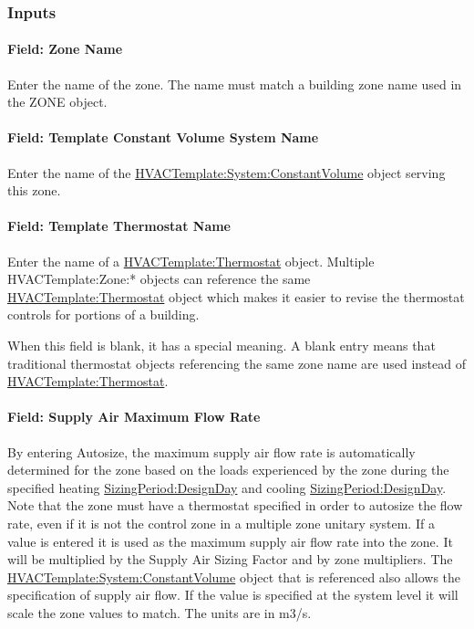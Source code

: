 \subsubsection{Inputs}\label{inputs-12-006}

\paragraph{Field: Zone Name}\label{field-zone-name-11}

Enter the name of the zone. The name must match a building zone name used in the ZONE object.

\paragraph{Field: Template Constant Volume System Name}\label{field-template-constant-volume-system-name}

Enter the name of the \hyperref[hvactemplatesystemconstantvolume]{HVACTemplate:System:ConstantVolume} object serving this zone.

\paragraph{Field: Template Thermostat Name}\label{field-template-thermostat-name-11}

Enter the name of a \hyperref[hvactemplatethermostat]{HVACTemplate:Thermostat} object. Multiple HVACTemplate:Zone:* objects can reference the same \hyperref[hvactemplatethermostat]{HVACTemplate:Thermostat} object which makes it easier to revise the thermostat controls for portions of a building.

When this field is blank, it has a special meaning. A blank entry means that traditional thermostat objects referencing the same zone name are used instead of \hyperref[hvactemplatethermostat]{HVACTemplate:Thermostat}.

\paragraph{Field: Supply Air Maximum Flow Rate}\label{field-supply-air-maximum-flow-rate-4}

By entering Autosize, the maximum supply air flow rate is automatically determined for the zone based on the loads experienced by the zone during the specified heating \hyperref[sizingperioddesignday]{SizingPeriod:DesignDay} and cooling \hyperref[sizingperioddesignday]{SizingPeriod:DesignDay}. Note that the zone must have a thermostat specified in order to autosize the flow rate, even if it is not the control zone in a multiple zone unitary system. If a value is entered it is used as the maximum supply air flow rate into the zone. It will be multiplied by the Supply Air Sizing Factor and by zone multipliers. The \hyperref[hvactemplatesystemconstantvolume]{HVACTemplate:System:ConstantVolume} object that is referenced also allows the specification of supply air flow. If the value is specified at the system level it will scale the zone values to match. The units are in m3/s.

